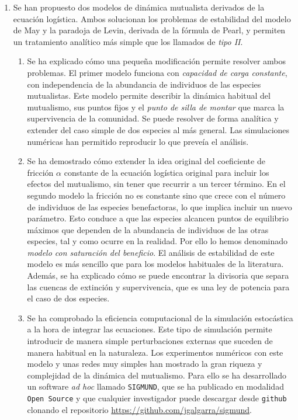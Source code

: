 \begin{enumerate}
\item Se han propuesto dos modelos de dinámica mutualista derivados de la ecuación logística. Ambos solucionan los problemas de estabilidad del modelo de May y la paradoja de Levin, derivada de la fórmula de Pearl, y permiten un tratamiento analítico más simple que los llamados de \textit{tipo II}.
	\begin{enumerate}
	\item Se ha explicado cómo una pequeña modificación permite resolver ambos problemas. El primer modelo funciona con \textit{capacidad de carga constante}, con independencia de la abundancia de individuos de las especies mutualistas. Este modelo permite describir la dinámica habitual del mutualismo, sus puntos fijos y el \textit{punto de silla de montar} que marca la supervivencia de la comunidad. Se puede resolver de forma analítica y extender del caso simple de dos especies al más general. Las simulaciones numéricas han permitido reproducir lo que preveía el análisis.
	\item Se ha demostrado cómo extender la idea original del coeficiente de fricción $\alpha$ constante de la ecuación logística original para incluir los efectos del mutualismo, sin tener que recurrir a un tercer término. En el segundo modelo la fricción no es constante sino que crece con el número de individuos de las especies benefactoras, lo que implica incluir un nuevo parámetro. Esto conduce a que las especies alcancen puntos de equilibrio máximos que dependen de la abundancia de individuos de las otras especies, tal y como ocurre en la realidad. Por ello lo hemos denominado \textit{modelo con saturación del beneficio}. 
	El análisis de estabilidad de este modelo es más sencillo que para los modelos habituales de la literatura. Además, se ha explicado cómo se puede encontrar la divisoria que separa las cuencas de extinción y supervivencia, que es una ley de potencia para el caso de dos especies.
	\item Se ha comprobado la eficiencia computacional de la simulación estocástica a la hora de integrar las ecuaciones. Este tipo de simulación permite introducir de manera simple perturbaciones externas que suceden de manera habitual en la naturaleza. Los experimentos numéricos con este modelo y unas redes muy simples han mostrado la gran riqueza y complejidad de la dinámica del mutualismo. Para ello se ha desarrollado un software \textit{ad hoc} llamado \texttt{SIGMUND}, que se ha publicado en modalidad \texttt{Open Source} y que cualquier investigador puede descargar desde \texttt{github} clonando el repositorio \url{https://github.com/jgalgarra/sigmund}.
	\end{enumerate}
	


\end{enumerate}
